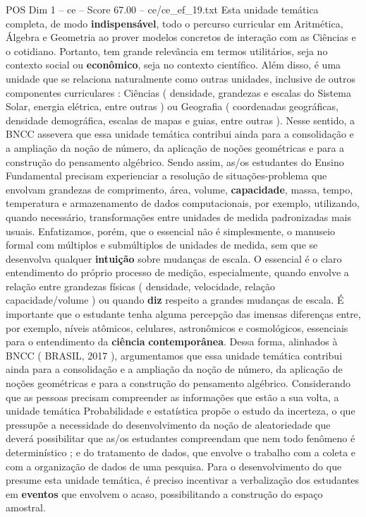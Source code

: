 \begin{textsample}{POS Dim 1 – ce – Score 67.00 – ce/ce\_ef\_19.txt}
Esta unidade temática completa, de modo \textbf{indispensável}, todo o percurso curricular em Aritmética, Álgebra e Geometria ao prover modelos concretos de interação com as Ciências e o cotidiano.
Portanto, tem grande relevância em termos utilitários, seja no contexto social ou \textbf{econômico}, seja no contexto científico.
Além disso, é uma unidade que se relaciona naturalmente como outras unidades, inclusive de outros componentes curriculares : Ciências ( densidade, grandezas e escalas do Sistema Solar, energia elétrica, entre outras ) ou Geografia ( coordenadas geográficas, densidade demográfica, escalas de mapas e guias, entre outras ).
Nesse sentido, a BNCC assevera que essa unidade temática contribui ainda para a consolidação e a ampliação da noção de número, da aplicação de noções geométricas e para a construção do pensamento algébrico.
Sendo assim, as/os estudantes do Ensino Fundamental precisam experienciar a resolução de situações-problema que envolvam grandezas de comprimento, área, volume, \textbf{capacidade}, massa, tempo, temperatura e armazenamento de dados computacionais, por exemplo, utilizando, quando necessário, transformações entre unidades de medida padronizadas mais usuais.
Enfatizamos, porém, que o essencial não é simplesmente, o manuseio formal com múltiplos e submúltiplos de unidades de medida, sem que se desenvolva qualquer \textbf{intuição} sobre mudanças de escala.
O essencial é o claro entendimento do próprio processo de medição, especialmente, quando envolve a relação entre grandezas físicas ( densidade, velocidade, relação capacidade/volume ) ou quando \textbf{diz} respeito a grandes mudanças de escala.
É importante que o estudante tenha alguma percepção das imensas diferenças entre, por exemplo, níveis atômicos, celulares, astronômicos e cosmológicos, essenciais para o entendimento da \textbf{ciência} \textbf{contemporânea}.
Dessa forma, alinhados à BNCC ( BRASIL, 2017 ), argumentamos que essa unidade temática contribui ainda para a consolidação e a ampliação da noção de número, da aplicação de noções geométricas e para a construção do pensamento algébrico.
Considerando que as pessoas precisam compreender as informações que estão a sua volta, a unidade temática Probabilidade e estatística propõe o estudo da incerteza, o que pressupõe a necessidade do desenvolvimento da noção de aleatoriedade que deverá possibilitar que as/os estudantes compreendam que nem todo fenômeno é determinístico ; e do tratamento de dados, que envolve o trabalho com a coleta e com a organização de dados de uma pesquisa.
Para o desenvolvimento do que presume esta unidade temática, é preciso incentivar a verbalização dos estudantes em \textbf{eventos} que envolvem o acaso, possibilitando a construção do espaço amostral.

\end{textsample}
